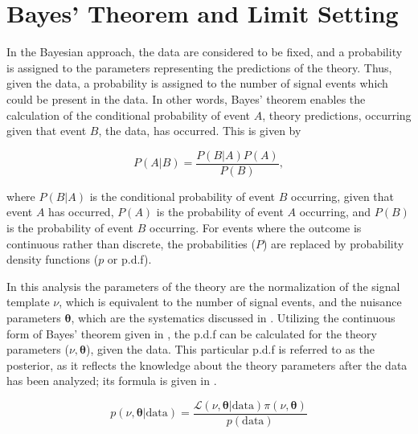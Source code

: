 \section{Bayes' Theorem and Limit Setting} \label{sec:fit:theory}

In the Bayesian approach, the data are considered to be fixed, and a
probability is assigned to the parameters representing the predictions of the
theory. Thus, given the data, a probability is assigned to the number of signal
events which could be present in the data.  In other words, Bayes' theorem
enables the calculation of the conditional probability of event $A$, theory
predictions, occurring given that event $B$, the data, has occurred. This is
given by 

\begin{equation} \label{sec:fit:general_bayes} 
P(A|B) = \frac{P(B|A)P(A)}{P(B)}, 
\end{equation}

where $P(B|A)$ is the conditional probability of event $B$ occurring, given that
event $A$ has occurred, $P(A)$ is the probability of event $A$ occurring, and
$P(B)$ is the probability of event $B$ occurring. For events where the outcome
is continuous rather than discrete, the probabilities ($P$) are replaced by
probability density functions ($p$ or p.d.f).

In this analysis the parameters of the theory are the normalization of the
signal template $\nu$, which is equivalent to the number of signal events, and
the nuisance parameters $\boldsymbol{\theta}$, which are the systematics
discussed in . Utilizing the continuous form of Bayes'
theorem given in , the p.d.f can be calculated for
the theory parameters ($\nu,\boldsymbol{\theta}$), given the data.  This
particular p.d.f is referred to as the posterior, as it reflects the knowledge
about the theory parameters after the data has been analyzed; its formula is given in
.

\begin{equation} \label{eq:fit:posterior}
p(\nu,\boldsymbol{\theta}|\text{data}) = \frac{\mathcal{L}(\nu,\boldsymbol{\theta}|\text{data})\pi(\nu,\boldsymbol{\theta})}{p(\text{data})}
\end{equation}

